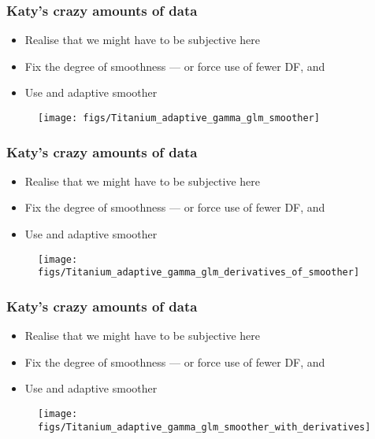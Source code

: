 \documentclass{beamer}
\begin{document}
\begin{frame}
    \frametitle{Katy's crazy amounts of data}
    \begin{itemize}
        \item Realise that we might have to be subjective here
        \item Fix the degree of smoothness --- or force use of fewer DF, and
        \item Use and adaptive smoother
    \end{itemize}
    \begin{figure}
        \center
        \texttt{[image: figs/Titanium\_adaptive\_gamma\_glm\_smoother]}
    \end{figure}
\end{frame}

\begin{frame}
    \frametitle{Katy's crazy amounts of data}
    \begin{itemize}
        \item Realise that we might have to be subjective here
        \item Fix the degree of smoothness --- or force use of fewer DF, and
        \item Use and adaptive smoother
    \end{itemize}
    \begin{figure}
        \center
        \texttt{[image: figs/Titanium\_adaptive\_gamma\_glm\_derivatives\_of\_smoother]}
    \end{figure}
\end{frame}

\begin{frame}
    \frametitle{Katy's crazy amounts of data}
    \begin{itemize}
        \item Realise that we might have to be subjective here
        \item Fix the degree of smoothness --- or force use of fewer DF, and
        \item Use and adaptive smoother
    \end{itemize}
    \begin{figure}
        \center
        \texttt{[image: figs/Titanium\_adaptive\_gamma\_glm\_smoother\_with\_derivatives]}
    \end{figure}
\end{frame}
\end{document}
